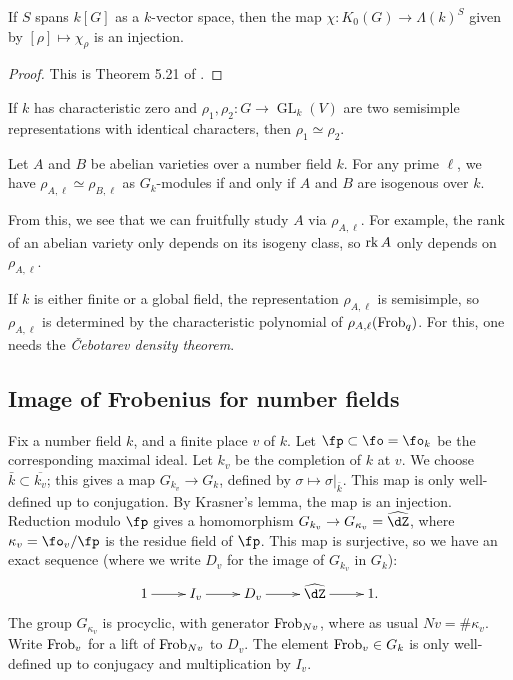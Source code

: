 \begin{theorem}
If $S$ spans $k[G]$ as a $k$-vector space, then the map 
$\chi:K_0(G) \to \Lambda(k)^S$ given by $[\rho]\mapsto \chi_\rho$ is an 
injection. 
\end{theorem}
\begin{proof}
This is Theorem 5.21 of \cite{eg11}. 
\end{proof}

\begin{corollary}
If $k$ has characteristic zero and 
$\rho_1,\rho_2:G \to \operatorname{GL}_k(V)$ are two semisimple representations 
with identical characters, then $\rho_1\simeq \rho_2$. 
\end{corollary}







\begin{theorem}
Let $A$ and $B$ be abelian varieties over a number field $k$. For any prime 
$\ell$, we have $\rho_{A,\ell}\simeq \rho_{B,\ell}$ as $G_k$-modules if and 
only if $A$ and $B$ are isogenous over $k$. 
\end{theorem}

From this, we see that we can fruitfully study $A$ via $\rho_{A,\ell}$. For 
example, the rank of an abelian variety only depends on its isogeny class, so 
$\operatorname{rk} A$ only depends on $\rho_{A,\ell}$. 

If $k$ is either finite or a global field, the representation $\rho_{A,\ell}$ 
is semisimple, so $\rho_{A,\ell}$ is determined by the characteristic 
polynomial of $\rho_{A,\ell}(\mathrm{Frob}_q)$. For this, one needs the 
\emph{\v Cebotarev density theorem}. 





\subsection{Image of Frobenius for number fields}

Fix a number field $k$, and a finite place $v$ of $k$. Let 
$\fp\subset \fo=\fo_k$ be the corresponding maximal ideal. Let $k_v$ be the 
completion of $k$ at $v$. We choose $\bar k\subset \overline{k_v}$; this gives 
a map $G_{k_v} \to G_k$, defined by $\sigma\mapsto \sigma|_{\bar k}$. This map 
is only well-defined up to conjugation. By Krasner's lemma, the map is an 
injection. Reduction modulo $\fp$ gives a homomorphism 
$G_{k_v} \to G_{\kappa_v}=\widehat\dZ$, where $\kappa_v = \fo_v/\fp$ is the 
residue field of $\fp$. This map is surjective, so we have an exact sequence 
(where we write $D_v$ for the image of $G_{k_v}$ in $G_k$):
\[\xymatrix{
  1 \ar[r] 
    & I_v \ar[r] 
    & D_v \ar[r] 
    & \widehat\dZ \ar[r] 
    & 1 \text{.}
}\]
The group $G_{\kappa_v}$ is procyclic, with generator 
$\mathrm{Frob}_{N v}$, where as usual $N v = \# \kappa_v$. Write $\mathrm{Frob}_v$ for a lift 
of $\mathrm{Frob}_{N v}$ to $D_v$. The element $\mathrm{Frob}_v\in G_k$ is only well-defined up 
to conjugacy and multiplication by $I_v$. 

